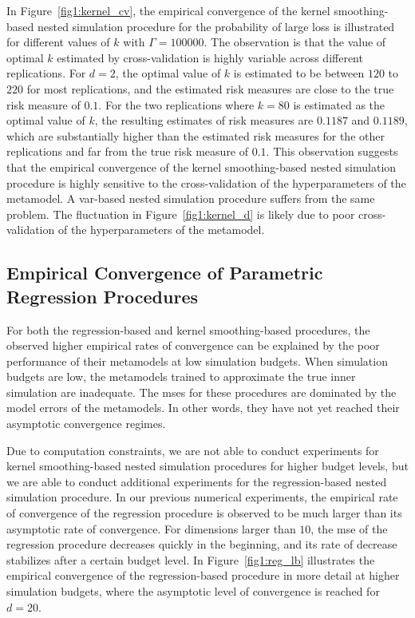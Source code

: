In Figure~\ref{fig1:kernel_cv}, the empirical convergence of the kernel smoothing-based nested simulation procedure for the probability of large loss is illustrated for different values of $k$ with $\Gamma = \num{100000}$.
The observation is that the value of optimal $k$ estimated by cross-validation is highly variable across different replications.
For $d = 2$, the optimal value of $k$ is estimated to be between $120$ to $220$ for most replications, and the estimated risk measures are close to the true risk measure of $0.1$.
For the two replications where $k = 80$ is estimated as the optimal value of $k$, the resulting estimates of risk measures are $0.1187$ and $0.1189$, which are substantially higher than the estimated risk measures for the other replications and far from the true risk measure of $0.1$.
This observation suggests that the empirical convergence of the kernel smoothing-based nested simulation procedure is highly sensitive to the cross-validation of the hyperparameters of the metamodel.
A \gls{var}-based nested simulation procedure suffers from the same problem. 
The fluctuation in Figure~\ref{fig1:kernel_d} is likely due to poor cross-validation of the hyperparameters of the metamodel.

\subsection{Empirical Convergence of Parametric Regression Procedures}\label{sec1:regression-convergence}

For both the regression-based and kernel smoothing-based procedures, the observed higher empirical rates of convergence can be explained by the poor performance of their metamodels at low simulation budgets. 
When simulation budgets are low, the metamodels trained to approximate the true inner simulation are inadequate.
The \gls{mse}s for these procedures are dominated by the model errors of the metamodels.
In other words, they have not yet reached their asymptotic convergence regimes.

Due to computation constraints, we are not able to conduct experiments for kernel smoothing-based nested simulation procedures for higher budget levels, but we are able to conduct additional experiments for the regression-based nested simulation procedure.
In our previous numerical experiments, the empirical rate of convergence of the regression procedure is observed to be much larger than its asymptotic rate of convergence.
For dimensions larger than $10$, the \gls{mse} of the regression procedure decreases quickly in the beginning, and its rate of decrease stabilizes after a certain budget level.
In Figure~\ref{fig1:reg_lb} illustrates the empirical convergence of the regression-based procedure in more detail at higher simulation budgets, where the asymptotic level of convergence is reached for $d = 20$.

